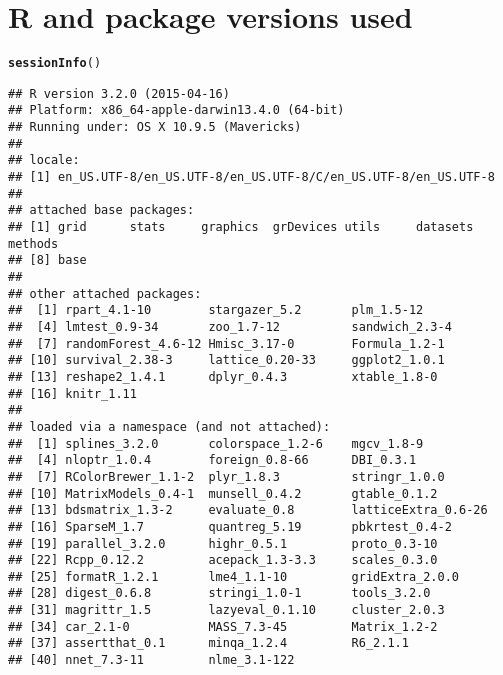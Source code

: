 \documentclass[11pt]{article}\usepackage[]{graphicx}\usepackage[]{color}
\makeatletter
\newcommand{\hlstd}[1]{\textcolor[rgb]{0.345,0.345,0.345}{#1}}%
\newcommand{\hlkwd}[1]{\textcolor[rgb]{0.737,0.353,0.396}{\textbf{#1}}}%
\newenvironment{kframe}{%
 \def\at@end@of@kframe{}%
 \ifinner\ifhmode%
  \def\at@end@of@kframe{\end{minipage}}%
  \begin{minipage}{\columnwidth}%
 \fi\fi%
 \def\FrameCommand##1{\hskip\@totalleftmargin \hskip-\fboxsep
 \colorbox{shadecolor}{##1}\hskip-\fboxsep
     \hskip-\linewidth \hskip-\@totalleftmargin \hskip\columnwidth}%
 \MakeFramed {\advance\hsize-\width
   \@totalleftmargin\z@ \linewidth\hsize
   \@setminipage}}%
 {\par\unskip\endMakeFramed%
 \at@end@of@kframe}
\newenvironment{knitrout}{}{} %
\makeatother
\begin{document}
\clearpage
\section{R and package versions used}
\begin{knitrout}
\color{fgcolor}\begin{kframe}
\begin{alltt}
\hlkwd{sessionInfo}\hlstd{()}
\end{alltt}
\begin{verbatim}
## R version 3.2.0 (2015-04-16)
## Platform: x86_64-apple-darwin13.4.0 (64-bit)
## Running under: OS X 10.9.5 (Mavericks)
## 
## locale:
## [1] en_US.UTF-8/en_US.UTF-8/en_US.UTF-8/C/en_US.UTF-8/en_US.UTF-8
## 
## attached base packages:
## [1] grid      stats     graphics  grDevices utils     datasets  methods  
## [8] base     
## 
## other attached packages:
##  [1] rpart_4.1-10        stargazer_5.2       plm_1.5-12         
##  [4] lmtest_0.9-34       zoo_1.7-12          sandwich_2.3-4     
##  [7] randomForest_4.6-12 Hmisc_3.17-0        Formula_1.2-1      
## [10] survival_2.38-3     lattice_0.20-33     ggplot2_1.0.1      
## [13] reshape2_1.4.1      dplyr_0.4.3         xtable_1.8-0       
## [16] knitr_1.11         
## 
## loaded via a namespace (and not attached):
##  [1] splines_3.2.0       colorspace_1.2-6    mgcv_1.8-9         
##  [4] nloptr_1.0.4        foreign_0.8-66      DBI_0.3.1          
##  [7] RColorBrewer_1.1-2  plyr_1.8.3          stringr_1.0.0      
## [10] MatrixModels_0.4-1  munsell_0.4.2       gtable_0.1.2       
## [13] bdsmatrix_1.3-2     evaluate_0.8        latticeExtra_0.6-26
## [16] SparseM_1.7         quantreg_5.19       pbkrtest_0.4-2     
## [19] parallel_3.2.0      highr_0.5.1         proto_0.3-10       
## [22] Rcpp_0.12.2         acepack_1.3-3.3     scales_0.3.0       
## [25] formatR_1.2.1       lme4_1.1-10         gridExtra_2.0.0    
## [28] digest_0.6.8        stringi_1.0-1       tools_3.2.0        
## [31] magrittr_1.5        lazyeval_0.1.10     cluster_2.0.3      
## [34] car_2.1-0           MASS_7.3-45         Matrix_1.2-2       
## [37] assertthat_0.1      minqa_1.2.4         R6_2.1.1           
## [40] nnet_7.3-11         nlme_3.1-122
\end{verbatim}
\end{kframe}
\end{knitrout}
\end{document}
